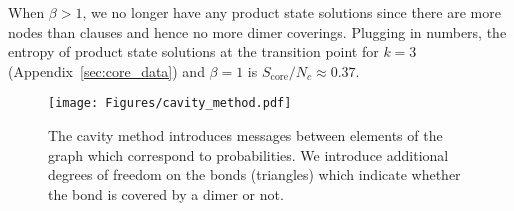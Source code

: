 \documentclass[aps,pra,twocolumn,superscriptaddress,amsmath]{revtex4-1}
\newcommand{\Sc}{S_{\mathrm{core}}}
\begin{document}
When $\beta > 1$, we no longer have any product state solutions since there are more nodes than clauses and hence no more dimer coverings. 
Plugging in numbers, the entropy of product state solutions at the transition point for $k=3$ (Appendix~\ref{sec:core_data}) and $\beta = 1$ is $\Sc/N_c \approx 0.37$.




\begin{figure}[t]
  \texttt{[image: Figures/cavity\_method.pdf]}
  \caption{\label{fig:cavity} The cavity method introduces messages between elements of the graph which correspond to probabilities. We introduce additional degrees of freedom on the bonds (triangles) which indicate whether the bond is covered by a dimer or not.}
\end{figure}
\end{document}

